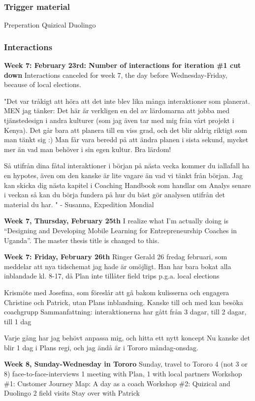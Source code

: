 \subsubsection*{Trigger material}
Preperation
Quizical
Duolingo

\subsubsection*{Interactions}
\textbf{Week 7: February 23rd: Number of interactions for iteration \#1 cut down}
Interactions canceled for week 7, the day before Wednesday-Friday, because of local elections.

"Det var tråkigt att höra att det inte blev lika många interaktioner som planerat.
MEN jag tänker: Det här är verkligen en del av lärdomarna att jobba med tjänstedesign i andra kulturer (som jag även tar med mig från vårt projekt i Kenya). Det går bara att planera till en viss grad, och det blir aldrig riktigt som man tänkt sig :) Man får vara beredd på att ändra planen i sista sekund, mycket mer än vad man behöver i sin egen kultur. Bra lärdom!

Så utifrån dina fåtal interaktioner i början på nästa vecka kommer du iallafall ha en hypotes, även om den kanske är lite vagare än vad vi tänkt från början. Jag kan skicka dig nästa kapitel i Coaching Handbook som handlar om Analys senare i veckan så kan du börja fundera på hur du bäst gör analysen utifrån det material du har. " - Susanna, Expedition Mondial

\textbf{Week 7, Thursday, February 25th}
I realize what I’m actually doing is “Designing and Developing Mobile Learning for Entrepreneurship Coaches in Uganda”. The master thesis title is changed to this.

\textbf{Week 7: Friday, February 26th}
Ringer Gerald 26 fredag februari, som meddelar att nya tidschemat jag hade är omöjligt. Han har bara bokat alla inblandade kl. 8-17, då Plan inte tillåter field trips p.g.a. local elections

Krismöte med Josefina, som föreslår att gå bakom kulisserna och engagera Christine och Patrick, utan Plans inblandning. Kanske till och med kan besöka coachgrupp
Sammanfattning: interaktionerna har gått från 3 dagar, till 2 dagar, till 1 dag

Varje gång har jag behövt anpassa mig, och hitta ett nytt koncept
Nu kanske det blir 1 dag i Plans regi, och jag ändå är i Tororo måndag-onsdag.

\textbf{Week 8, Sunday-Wednesday in Tororo}
Sunday, travel to Tororo
4 (not 3 or 8) face-to-face-interviews
1 meeting with Plan, 1 with local partners
Workshop \#1: Customer Journey Map: A day as a coach
Workshop \#2: Quizical and Duolingo
2 field visits
Stay over with Patrick

